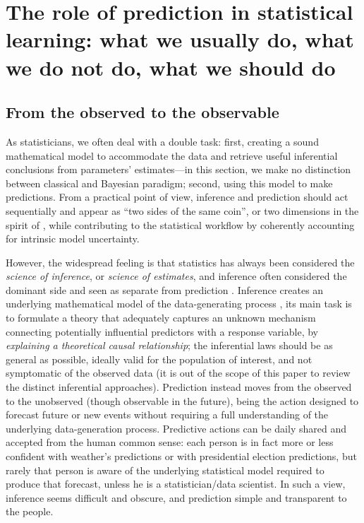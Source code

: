 \documentclass{statsoc}
\begin{document}
\section{The role of prediction in statistical learning: what we usually do, what we do not do, what we should do}
\label{sec:role}

\subsection{From the observed to the observable}

As statisticians, we often deal with a double task: first, creating a sound mathematical model to accommodate the data and retrieve useful inferential conclusions from 
parameters' estimates---in this section, we make no distinction between classical and Bayesian paradigm; second, using this model to make predictions. From a practical point of view, inference and prediction should act sequentially and appear as ``two sides of the same coin'', or two dimensions in the spirit of \cite{shmueli2010explain}, while contributing to the statistical workflow by coherently accounting for intrinsic model uncertainty.



However, the widespread feeling is that statistics has always been considered the \emph{science of inference}, or \emph{science of estimates}, and inference often considered the dominant side and seen as separate from prediction \citep{shmueli2010explain}.  Inference creates 
an underlying mathematical model of the data-generating process \citep{bzdok2018points}, its main task is to formulate a theory that adequately captures an unknown mechanism connecting potentially influential predictors with a response variable, by \emph{explaining a theoretical causal relationship}; the 
inferential laws should be as general as possible, ideally valid for the population of interest, and not symptomatic of the observed data (it is out of the scope of this paper to review the distinct inferential 
approaches). Prediction instead moves from the observed to the unobserved (though observable in the future), being the action designed to forecast future or new events without requiring a full understanding of the underlying data-generation process. Predictive actions can be daily shared and accepted from the human common sense: each person is in fact more or less confident with weather's predictions or with presidential election predictions, but rarely that person is aware of the underlying 
statistical model required to produce that forecast, unless he is a statistician/data scientist. In such a view, inference seems difficult and obscure, and prediction simple and transparent 
to the people. 
\end{document}
